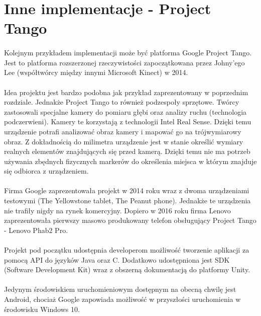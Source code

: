 \newpage
\section{Inne implementacje - Project Tango}
\paragraph{}
Kolejnym przykładem implementacji może być platforma Google Project Tango\cite{tango}. Jest to platforma rozszerzonej rzeczywistości zapoczątkowana przez Johny'ego Lee (współtwórcy między innymi Microsoft Kinect\cite{autor}) w 2014. 
\paragraph{}
Idea projektu jest bardzo podobna jak przykład zaprezentowany w poprzednim rozdziale. Jednakże Project Tango to również podzespoły sprzętowe. Twórcy zastosowali specjalne kamery do pomiaru głębi oraz analizy ruchu (technologia podczerwieni). Kamery te korzystają z technologii Intel Real Sense. Dzięki temu urządzenie potrafi analizować obraz kamery i mapować go na trójwymiarowy obraz. Z dokładnością do milimetra urządzenie jest w stanie określić wymiary realnych elementów znajdujących się przed kamerą. Dzięki temu nie ma potrzeb używania zbędnych fizycznych markerów do określenia miejsca w którym znajduje się odbiorca z urządzeniem.
\paragraph{}
Firma Google zaprezentowała projekt w 2014 roku wraz z dwoma urządzeniami testowymi (The Yellowstone tablet,  The Peanut phone). Jednakże te urządzenia nie trafiły nigdy na rynek komercyjny. Dopiero w 2016 roku firma Lenovo zaprezentowała pierwszy masowo produkowany telefon obsługujący Project Tango - Lenovo Phab2 Pro.
\paragraph{}
Projekt pod początku udostępnia developerom możliwość tworzenie aplikacji za pomocą API do języków Java oraz C. Dodatkowo udostępniona jest SDK (Software Development Kit) wraz z obszerną dokumentacją do platformy Unity\cite{tangounity}.
\paragraph{}
Jedynym środowiskiem uruchomieniowym dostępnym na obecną chwilę jest Android, chociaż Google zapowiada możliwość w przyszłości uruchomienia w środowisku Windows 10.

